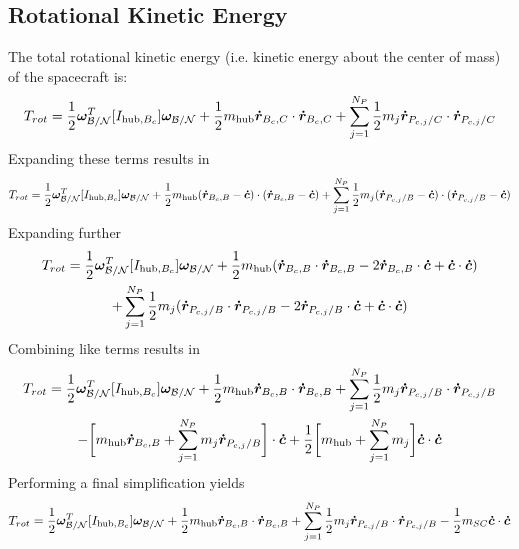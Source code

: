 \subsection{Rotational Kinetic Energy}
The total rotational kinetic energy (i.e. kinetic energy about the center of mass) of
the spacecraft is:
\begin{equation}
	T_{rot}=\frac{1}{2}\bm\omega_{\cal B/N}^T [I_{\text{hub},B_c}] \bm\omega_{\cal B/N}+\frac{1}{2}m_{\text{hub}}\bm{\dot{r}}_{B_c,C}\cdot\bm{\dot{r}}_{B_c,C}+\sum\limits_{j=1}^{N_P} \frac{1}{2} m_j \bm{\dot{r}}_{P_{c,j}/C}\cdot\bm{\dot{r}}_{P_{c,j}/C}
	\label{eq:RKE1}
\end{equation}
Expanding these terms results in
\begin{equation}
	T_{rot}=\frac{1}{2}\bm\omega_{\cal B/N}^T [I_{\text{hub},B_c}] \bm\omega_{\cal B/N}+\frac{1}{2}m_{\text{hub}}(\bm{\dot{r}}_{B_c,B}-\bm{\dot{c}})\cdot(\bm{\dot{r}}_{B_c,B}-\bm{\dot{c}})+\sum\limits_{j=1}^{N_P} \frac{1}{2} m_j (\bm{\dot{r}}_{P_{c,j}/B}-\bm{\dot{c}})\cdot(\bm{\dot{r}}_{P_{c,j}/B}-\bm{\dot{c}})
	\label{eq:RKE2}
\end{equation}
Expanding further
\begin{multline}
	T_{rot}=\frac{1}{2}\bm\omega_{\cal B/N}^T [I_{\text{hub},B_c}] \bm\omega_{\cal B/N}+\frac{1}{2}m_{\text{hub}}(\bm{\dot{r}}_{B_c,B}\cdot\bm{\dot{r}}_{B_c,B}-2\bm{\dot{r}}_{B_c,B}\cdot\bm{\dot{c}}+\bm{\dot{c}}\cdot\bm{\dot{c}})\\+\sum\limits_{j=1}^{N_P} \frac{1}{2} m_j (\bm{\dot{r}}_{P_{c,j}/B}\cdot\bm{\dot{r}}_{P_{c,j}/B}-2\bm{\dot{r}}_{P_{c,j}/B}\cdot\bm{\dot{c}}+\bm{\dot{c}}\cdot\bm{\dot{c}})
	\label{eq:RKE3}
\end{multline}
Combining like terms results in
\begin{multline}
	T_{rot}=\frac{1}{2}\bm\omega_{\cal B/N}^T [I_{\text{hub},B_c}] \bm\omega_{\cal B/N}+\frac{1}{2}m_{\text{hub}}\bm{\dot{r}}_{B_c,B}\cdot\bm{\dot{r}}_{B_c,B}+\sum\limits_{j=1}^{N_P} \frac{1}{2} m_j \bm{\dot{r}}_{P_{c,j}/B}\cdot\bm{\dot{r}}_{P_{c,j}/B}\\-\bigg[m_{\text{hub}}\bm{\dot{r}}_{B_c,B}+\sum\limits_{j=1}^{N_P} m_j \bm{\dot{r}}_{P_{c,j}/B}\bigg]\cdot\bm{\dot{c}}+\frac{1}{2}\bigg[m_{\text{hub}}+\sum\limits_{j=1}^{N_P} m_j \bigg]\bm{\dot{c}}\cdot\bm{\dot{c}}
	\label{eq:RKE3_1}
\end{multline}
Performing a final simplification yields
\begin{equation}
	T_{rot}=\frac{1}{2}\bm\omega_{\cal B/N}^T [I_{\text{hub},B_c}] \bm\omega_{\cal B/N}+\frac{1}{2}m_{\text{hub}}\bm{\dot{r}}_{B_c,B}\cdot\bm{\dot{r}}_{B_c,B}+\sum\limits_{j=1}^{N_P} \frac{1}{2} m_j \bm{\dot{r}}_{P_{c,j}/B}\cdot\bm{\dot{r}}_{P_{c,j}/B}-\frac{1}{2}m_{SC}\bm{\dot{c}}\cdot\bm{\dot{c}}
	\label{eq:RKE4}
\end{equation} \\

